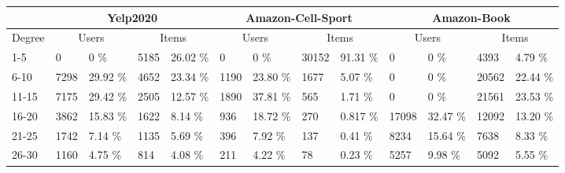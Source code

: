 \begin{table*}[]
    \scriptsize
    \begin{tabular}{|l|l|l|l|l|l|l|l|l|l|l|l|l|}
        \hline
                & \multicolumn{4}{c|}{Yelp2020} & \multicolumn{4}{c|}{Amazon-Cell-Sport} & \multicolumn{4}{c|}{Amazon-Book}                                                                                                                                                     \\ \hline
        Degree   & \multicolumn{2}{c|}{Users}    & \multicolumn{2}{c|}{Items}             & \multicolumn{2}{c|}{Users}       & \multicolumn{2}{c|}{Items} & \multicolumn{2}{c|}{Users} & \multicolumn{2}{c|}{Items}                                                              \\ \hline
        1-5     & 0                             & 0 \%                                   & 5185                             & 26.02 \%                   & 0                          & 0 \%                       & 30152 & 91.31 \%     & 0     & 0 \%     & 4393  & 4.79  \% \\ \hline
        6-10    & 7298                          & 29.92 \%                               & 4652                             & 23.34 \%                   & 1190                       & 23.80 \%                   & 1677  & 5.07 \%      & 0     & 0 \%     & 20562 & 22.44 \% \\ \hline
        11-15   & 7175                          & 29.42 \%                               & 2505                             & 12.57 \%                   & 1890                       & 37.81 \%                   & 565   & 1.71 \%      & 0     & 0 \%     & 21561 & 23.53 \% \\ \hline
        16-20   & 3862                          & 15.83 \%                               & 1622                             & 8.14 \%                    & 936                        & 18.72 \%                   & 270   & 0.817 \%     & 17098 & 32.47 \% & 12092 & 13.20 \% \\ \hline
        21-25   & 1742                          & 7.14 \%                                & 1135                             & 5.69 \%                    & 396                        & 7.92 \%                    & 137   & 0.41 \%      & 8234  & 15.64 \% & 7638  & 8.33 \%  \\ \hline
        26-30   & 1160                          & 4.75 \%                                & 814                              & 4.08 \%                    & 211                        & 4.22 \%                    & 78    & 0.23 \%      & 5257  & 9.98 \%  & 5092  & 5.55 \%  \\ \hline

\end{tabular}
\end{table*}
